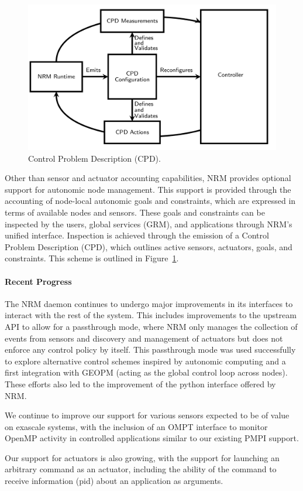 \begin{figure}
\includegraphics[width=.38\textwidth]{projects/2.3.1-PMR/2.3.1.19-Argo-PowerSteering/cpd}
\caption{Control Problem Description (CPD).}
\label{fig:argo-nrm-cpd}
\end{figure}
Other than sensor and actuator accounting capabilities, NRM provides
optional support for autonomic node management. This support is provided through
the accounting of node-local autonomic goals and constraints, which are
expressed in terms of available nodes and sensors. These goals and
constraints can be inspected by the users, global services (GRM), and
applications through NRM's unified interface. Inspection is achieved through
the emission of a Control Problem Description (CPD), which outlines active
sensors, actuators, goals, and constraints. This scheme is outlined in 
Figure~\ref{fig:argo-nrm-cpd}.

\paragraph{Recent Progress}

The NRM daemon continues to undergo major improvements in its interfaces to
interact with the rest of the system. This includes improvements to the
upstream API to allow for a passthrough mode, where NRM only manages the
collection of events from sensors and discovery and management of actuators
but does not enforce any control policy by itself. This passthrough mode
was used successfully to explore alternative control schemes inspired by
autonomic computing and a first integration with GEOPM (acting as the
global control loop across nodes). These efforts also led to the
improvement of the python interface offered by NRM.

We continue to improve our support for various sensors expected to be of
value on exascale systems, with the inclusion of an OMPT interface to
monitor OpenMP activity in controlled applications similar to our existing
PMPI support.

Our support for actuators is also growing, with the support for launching
an arbitrary command as an actuator, including the ability of the command
to receive information (pid) about an application as arguments.

